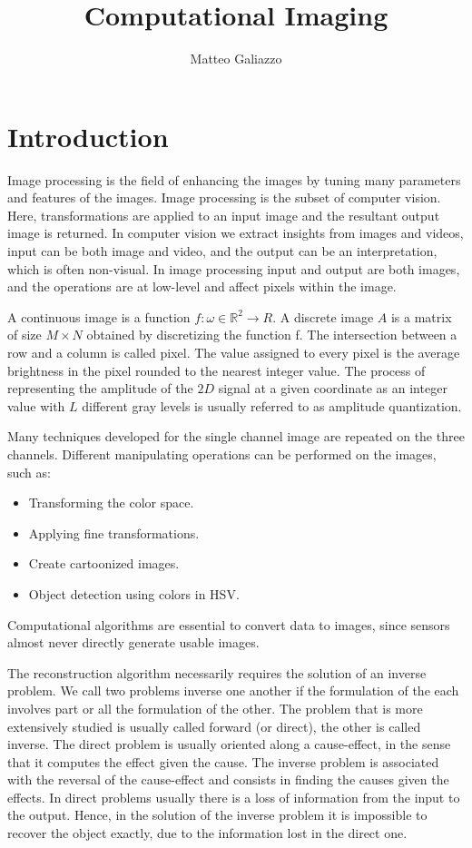 \documentclass{article}
\title{Computational Imaging}
\author{Matteo Galiazzo}
\begin{document}
\maketitle

\tableofcontents

\section{Introduction}

Image processing is the field of enhancing the images by tuning many parameters and features of the images.
Image processing is the subset of computer vision.
Here, transformations are applied to an input image and the resultant output image is returned.
In computer vision we extract insights from images and videos, input can be both image and video, and the output can be an interpretation, which is often non-visual.
In image processing input and output are both images, and the operations are at low-level and affect pixels within the image.

A continuous image is a function $f:\omega \in \mathbb{R}^2 \rightarrow R$.
A discrete image $A$ is a matrix of size $M \times N$ obtained by discretizing the function f.
The intersection between a row and a column is called pixel.
The value assigned to every pixel is the average brightness in the pixel rounded to the nearest integer value.
The process of representing the amplitude of the $2D$ signal at a given coordinate as an integer value with $L$ different gray levels is usually referred to as amplitude quantization.

Many techniques developed for the single channel image are repeated on the three channels.
Different manipulating operations can be performed on the images, such as:
\begin{itemize}
  \item Transforming the color space.
  \item Applying fine transformations.
  \item Create cartoonized images.
  \item Object detection using colors in HSV.
\end{itemize}

Computational algorithms are essential to convert data to images, since sensors almost never directly generate usable images.

The reconstruction algorithm necessarily requires the solution of an inverse problem.
We call two problems inverse one another if the formulation of the each involves part or all the formulation of the other.
The problem that is more extensively studied is usually called forward (or direct), the other is called inverse.
The direct problem is usually oriented along a cause-effect, in the sense that it computes the effect given the cause.
The inverse problem is associated with the reversal of the cause-effect and consists in finding the causes given the effects.
In direct problems usually there is a loss of information from the input to the output.
Hence, in the solution of the inverse problem it is impossible to recover the object exactly, due to the information lost in the direct one.
\end{document}
